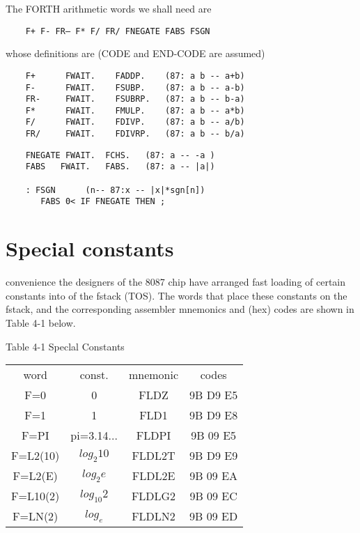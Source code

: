 The FORTH arithmetic words we shall need are
\begin{lstlisting}
    F+ F- FR— F* F/ FR/ FNEGATE FABS FSGN
\end{lstlisting}
whose definitions are (CODE and END-CODE are assumed)

\begin{lstlisting}
    F+      FWAIT.    FADDP.    (87: a b -- a+b)
    F-      FWAIT.    FSUBP.    (87: a b -- a-b)
    FR-     FWAIT.    FSUBRP.   (87: a b -- b-a)
    F*      FWAIT.    FMULP.    (87: a b -- a*b)
    F/      FWAIT.    FDIVP.    (87: a b -- a/b)
    FR/     FWAIT.    FDIVRP.   (87: a b -- b/a)
\end{lstlisting}

\begin{lstlisting}
    FNEGATE FWAIT.  FCHS.   (87: a -- -a )
    FABS   FWAIT.   FABS.   (87: a -- |a|)

    : FSGN      (n-- 87:x -- |x|*sgn[n])
       FABS 0< IF FNEGATE THEN ;
\end{lstlisting}

\section{Special constants}

 convenience the designers of the 8087 chip have arranged fast loading of certain constants into  of the fstack (TOS). The words that place these constants on the fstack, and the corresponding assembler mnemonics and (hex) codes are shown in Table 4-1 below.

Table 4-1 Speclal Constants
\begin{center}
    \begin{tabular}{|c c c c|}
        \hline
        word      & const.      & mnemonic & codes     \\
        F=0       & 0           & FLDZ     & 9B D9 E5  \\
        F=1       & 1           & FLD1     & 9B D9 E8  \\
        F=PI      & pi=3.14...  & FLDPI    & 9B 09 E5  \\
        F=L2(10)  & $log_{2}10$ & FLDL2T   & 9B D9 E9  \\ 
        F=L2(E)   & $log_{2}e$  & FLDL2E   & 9B 09 EA  \\
        F=L10(2)  & $log_{10}2$ & FLDLG2   & 9B 09 EC  \\
        F=LN(2)   & $log_{e}$   & FLDLN2   & 9B 09 ED  \\
        \hline
    \end{tabular}
\end{center}

